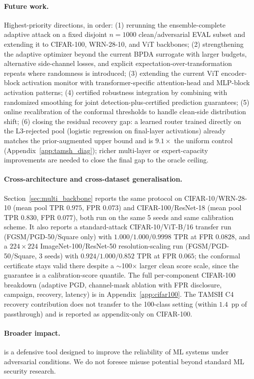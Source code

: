 \paragraph{Future work.}
Highest-priority directions, in order:
(1) rerunning the ensemble-complete adaptive attack on a fixed disjoint
$n{=}1000$ clean/adversarial EVAL subset and extending it to CIFAR-100,
WRN-28-10, and ViT backbones;
(2) strengthening the adaptive optimizer beyond the current BPDA
surrogate with larger budgets, alternative side-channel losses, and
explicit expectation-over-transformation repeats where randomness is
introduced;
(3) extending the current ViT encoder-block activation monitor with
transformer-specific attention-head and MLP-block activation patterns;
(4) certified robustness integration by combining \prism with randomized
smoothing \cite{cohen2019certified} for joint detection-plus-certified
prediction guarantees;
(5) online recalibration of the conformal thresholds to handle clean-side
distribution shift;
(6) closing the residual \tamsh recovery gap: a learned router trained
directly on the L3-rejected pool (logistic regression on final-layer
activations) already matches the prior-augmented upper bound and is
$9.1\times$ the uniform control (Appendix~\ref{app:tamsh_diag}); richer
multi-layer or expert-capacity improvements are needed to close the final
gap to the
oracle ceiling.

\paragraph{Cross-architecture and cross-dataset generalisation.}
Section~\ref{sec:multi_backbone} reports the same protocol on
CIFAR-10/WRN-28-10 (mean pool TPR $0.975$, FPR $0.073$) and
CIFAR-100/ResNet-18 (mean pool TPR $0.830$, FPR $0.077$), both run
on the same 5 seeds and same calibration scheme. It also reports a
standard-attack CIFAR-10/ViT-B/16 transfer run (FGSM/PGD-50/Square only)
with $1.000/1.000/0.9998$ TPR at FPR $0.0828$, and a $224\times224$
ImageNet-100/ResNet-50 resolution-scaling run (FGSM/PGD-50/Square, 3
seeds) with $0.924/1.000/0.852$ TPR at FPR $0.065$; the conformal
certificate stays valid there despite a $\sim$100$\times$ larger clean
score scale, since the guarantee is a calibration-score quantile.
The full per-component CIFAR-100 breakdown (adaptive PGD,
channel-mask ablation with FPR disclosure, campaign, recovery, latency)
is in Appendix~\ref{app:cifar100}. The TAMSH C4 recovery contribution
does not transfer to the 100-class setting (within $1.4$~pp of
passthrough) and is reported as appendix-only on CIFAR-100.

\paragraph{Broader impact.}
\prism is a defensive tool designed to improve the reliability 
of ML systems under adversarial conditions.
We do not foresee misuse potential beyond standard ML security research.
